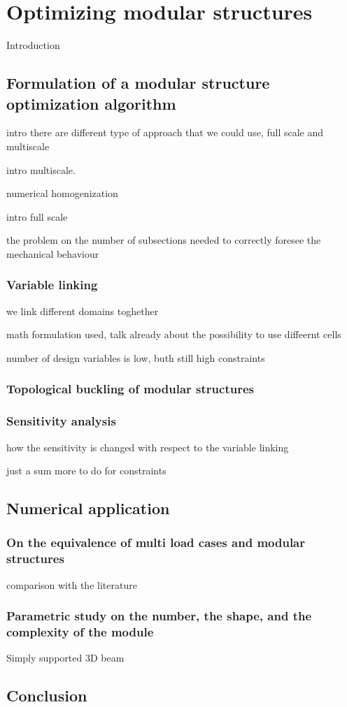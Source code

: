 \setchapterpreamble[u]{\margintoc}
\chapter{Optimizing modular structures}
Introduction
\section{Formulation of a modular structure optimization algorithm}
intro there are different type of approach that we could use, full scale and multiscale

intro multiscale.

numerical homogenization

intro full scale

the problem on the number of subsections needed to correctly foresee the mechanical behaviour
\subsection{Variable linking}
we link different domains toghether

math formulation used, talk already about the possibility to use diffeernt cells

number of design variables is low, buth still high constraints
\subsection{Topological buckling of modular structures}
\subsection{Sensitivity analysis}
how the sensitivity is changed with respect to the variable linking

just a sum more to do for constraints

\section{Numerical application}
\subsection{On the equivalence of multi load cases and modular structures}
comparison with the literature
\subsection{Parametric study on the number, the shape, and the complexity of the module}



Simply supported 3D beam
\section{Conclusion}